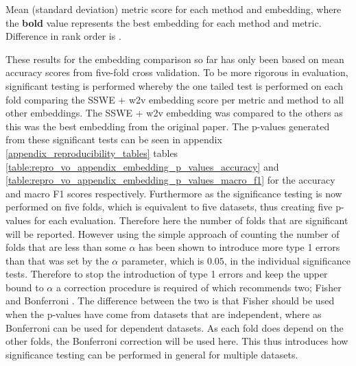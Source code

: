 \FloatBarrier
\begin{table}[!h]
    \centering
    
    \caption{Mean (standard deviation) metric score for each method and embedding, where the \textbf{bold} value represents the best embedding for each method and metric. Difference in rank order is .}
    \label{table:repro_vo_word_embeddings_results}
\end{table}
\FloatBarrier

These results for the embedding comparison so far has only been based on mean accuracy scores from five-fold cross validation. To be more rigorous in evaluation, significant testing is performed whereby the one tailed test is performed on each fold comparing the SSWE + w2v embedding score per metric and method to all other embeddings. The SSWE + w2v embedding was compared to the others as this was the best embedding from the original paper. The p-values generated from these significant tests can be seen in appendix \ref{appendix_reproducibility_tables} tables \ref{table:repro_vo_appendix_embedding_p_values_accuracy} and \ref{table:repro_vo_appendix_embedding_p_values_macro_f1} for the accuracy and macro F1 scores respectively. Furthermore as the significance testing is now performed on five folds, which is equivalent to five datasets, thus creating five p-values for each evaluation. Therefore here the number of folds that are significant will be reported. However using the simple approach of counting the number of folds that are less than some $\alpha$ has been shown to introduce more type 1 errors \citep{dror-etal-2017-replicability} than that was set by the $\alpha$ parameter, which is $0.05$, in the individual significance tests. Therefore to stop the introduction of type 1 errors and keep the upper bound to $\alpha$ a correction procedure is required of which \citet{dror-etal-2018-hitchhikers} recommends two; Fisher and Bonferroni \citep{benjamini2008screening}. The difference between the two is that Fisher should be used when the p-values have come from datasets that are independent, where as Bonferroni can be used for dependent datasets. As each fold does depend on the other folds, the Bonferroni correction will be used here. This thus introduces how significance testing can be performed in general for multiple datasets.


